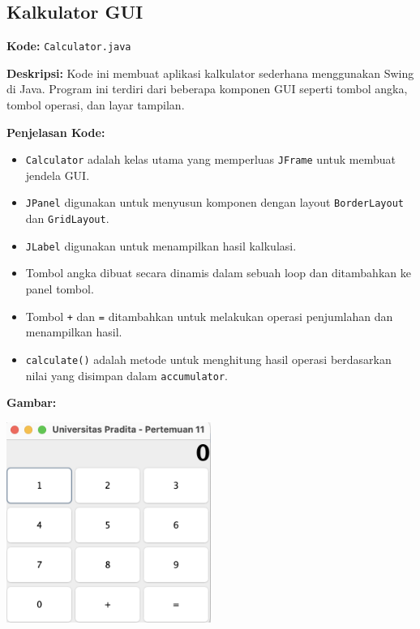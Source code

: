 \subsection{Kalkulator GUI}

\textbf{Kode:} \texttt{Calculator.java}

\textbf{Deskripsi:} Kode ini membuat aplikasi kalkulator sederhana menggunakan Swing di Java. Program ini terdiri dari beberapa komponen GUI seperti tombol angka, tombol operasi, dan layar tampilan.

\textbf{Penjelasan Kode:}
\begin{itemize}
	\item \texttt{Calculator} adalah kelas utama yang memperluas \texttt{JFrame} untuk membuat jendela GUI.
	\item \texttt{JPanel} digunakan untuk menyusun komponen dengan layout \texttt{BorderLayout} dan \texttt{GridLayout}.
	\item \texttt{JLabel} digunakan untuk menampilkan hasil kalkulasi.
	\item Tombol angka dibuat secara dinamis dalam sebuah loop dan ditambahkan ke panel tombol.
	\item Tombol \texttt{+} dan \texttt{=} ditambahkan untuk melakukan operasi penjumlahan dan menampilkan hasil.
	\item \texttt{calculate()} adalah metode untuk menghitung hasil operasi berdasarkan nilai yang disimpan dalam \texttt{accumulator}.
\end{itemize}

\textbf{Gambar:} \\
\begin{center}
	\includegraphics[width=0.5\textwidth]{assets/pertemuan11/calculator.png}
\end{center}

